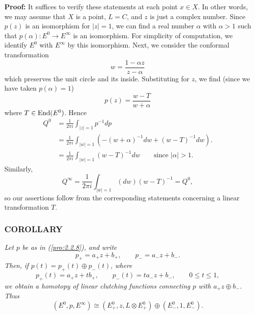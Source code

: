 \textbf{Proof:} It suffices to verify these statements at each point $x \in X$. In other words, we may assume that $X$ is a point, $L = C$, and $z$ is just a complex number. Since $p(z)$ is an isomorphism for $|z| = 1$, we can find a real number $\alpha$ with $\alpha > 1$ such that $p(\alpha): E^0 \to E^\infty$ is an isomorphism. For simplicity of computation, we identify $E^0$ with $E^\infty$ by this isomorphism. Next, we consider the conformal transformation
\begin{equation*}
    w = \frac{1 - \alpha z}{z - \alpha}
\end{equation*}
which preserves the unit circle and its inside. Substituting for $z$, we find (since we have taken $p(\alpha) = 1$)
\begin{equation*}
    p(z) = \frac{w - T}{w + \alpha}
\end{equation*}
where $T \in \operatorname{End}(E^0)$. Hence
\begin{align*}
    Q^0 &= \frac{1}{2 \pi i} \int_{|z| = 1} p^{-1} dp \\
    &= \frac{1}{2 \pi i} \int_{|w| = 1} (-(w + \alpha)^{-1} dw + (w - T)^{-1} dw) .\\
    &= \frac{1}{2 \pi i} \int_{|w| = 1} (w - T)^{-1} dw \qquad \text{since } |\alpha| > 1.
\end{align*}
Similarly,
\begin{equation*}
    Q^\infty = \frac{1}{2 \pi i} \int_{|w| = 1} (dw)(w - T)^{-1} = Q^0,
\end{equation*}
so our assertions follow from the corresponding statements concerning a linear transformation $T$.

\subsubsection{COROLLARY}\label{cor:2.2.9} \textit{Let $p$ be as in (\ref{pro:2.2.8}), and write}
\begin{equation*}
    p_+ = a_+ z + b_+, \qquad p_- = a_- z + b_- .
\end{equation*}
\textit{Then, if $p(t) = p_+(t) \oplus p_-(t)$, where}
\begin{equation*}
    p_+(t) = a_+ z + tb_+, \qquad p_-(t) = ta_- z + b_-, \qquad 0 \leq t \leq 1,
\end{equation*}
\textit{we obtain a homotopy of linear clutching functions connecting $p$ with $a_+ z \oplus b_-$. Thus}
\begin{equation*}
    (E^0, p, E^\infty) \cong (E^0_+, z, L \otimes E^0_+) \oplus (E^0_-, 1, E^0_-) .
\end{equation*}

